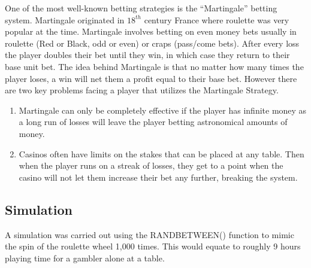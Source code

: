 \documentclass[12pt]{article}
\begin{document}
One of the most well-known betting strategies is the “Martingale” betting system. Martingale originated in $18^{th}$ century France where roulette was very popular at the time. Martingale involves betting on even money bets usually in roulette (Red or Black, odd or even) or craps (pass/come bets). After every loss the player doubles their bet until they win, in which case they return to their base unit bet. The idea behind Martingale is that no matter how many times the player loses, a win will net them a profit equal to their base bet. However there are two key problems facing a player that utilizes the Martingale Strategy.

\begin{enumerate}
\item Martingale can only be completely effective if the player has infinite money as a long run of losses will leave the player betting astronomical amounts of money.
\item Casinos often have limits on the stakes that can be placed at any table. Then when the player runs on a streak of losses, they get to a point when the casino will not let them increase their bet any further, breaking the system.
\end{enumerate}

\subsection{Simulation}
A simulation was carried out using the RANDBETWEEN() function to mimic the spin of the roulette wheel 1,000 times. This would equate to roughly 9 hours playing time for a gambler alone at a table.
\end{document}
